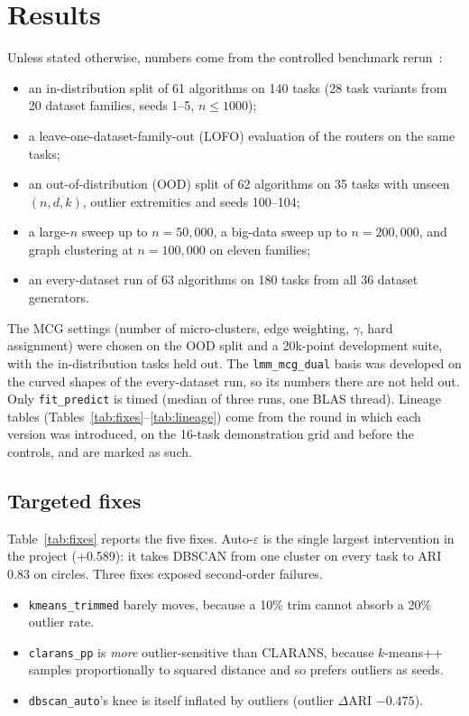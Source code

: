 \documentclass[11pt,a4paper]{article}
\newcommand{\code}[1]{\texttt{#1}}
\begin{document}
\section{Results}\label{sec:results}

Unless stated otherwise, numbers come from the controlled benchmark
rerun~\cite{clustbenchharness}:
\begin{itemize}
  \item an in-distribution split of 61 algorithms on 140 tasks (28 task
  variants from 20 dataset families, seeds 1--5, $n \le 1000$);
  \item a leave-one-dataset-family-out (LOFO) evaluation of the routers on
  the same tasks;
  \item an out-of-distribution (OOD) split of 62 algorithms on 35 tasks with
  unseen $(n,d,k)$, outlier extremities and seeds 100--104;
  \item a large-$n$ sweep up to $n = 50{,}000$, a big-data sweep up to
  $n = 200{,}000$, and graph clustering at $n = 100{,}000$ on eleven
  families;
  \item an every-dataset run of 63 algorithms on 180 tasks from all 36
  dataset generators.
\end{itemize}
The MCG settings (number of micro-clusters, edge weighting, $\gamma$, hard
assignment) were chosen on the OOD split and a 20k-point development suite,
with the in-distribution tasks held out. The \code{lmm\_mcg\_dual} basis was
developed on the curved shapes of the every-dataset run, so its numbers there
are not held out.
Only \code{fit\_predict} is timed (median of three runs, one BLAS thread).
Lineage tables (Tables~\ref{tab:fixes}--\ref{tab:lineage}) come from the
round in which each version was introduced, on the 16-task demonstration grid
and before the controls, and are marked as such.

\subsection{Targeted fixes}
Table~\ref{tab:fixes} reports the five fixes. Auto-$\varepsilon$ is the single
largest intervention in the project (+0.589): it takes DBSCAN from one
cluster on every task to ARI 0.83 on circles. Three fixes exposed second-order
failures.
\begin{itemize}
  \item \code{kmeans\_trimmed} barely moves, because a 10\% trim cannot absorb
  a 20\% outlier rate.
  \item \code{clarans\_pp} is \emph{more} outlier-sensitive than CLARANS,
  because $k$-means++ samples proportionally to squared distance and so
  prefers outliers as seeds.
  \item \code{dbscan\_auto}'s knee is itself inflated by outliers (outlier
  $\Delta$ARI $-0.475$).
\end{itemize}
\end{document}
